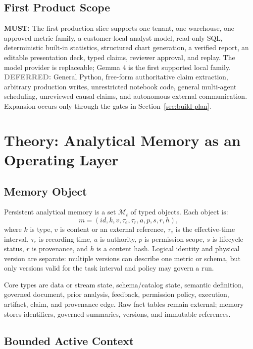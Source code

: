\documentclass[10pt]{article}
\newcommand{\must}{\textbf{\textcolor{amosblue}{MUST:}}\xspace}
\newcommand{\deferred}{\textbf{\textcolor{gray}{DEFERRED:}}\xspace}
\newcommand{\mem}{\mathcal{M}}
\begin{document}
\subsection{First Product Scope}

\must The first production slice supports one tenant, one warehouse, one approved metric family, a customer-local analyst model, read-only SQL, deterministic built-in statistics, structured chart generation, a verified report, an editable presentation deck, typed claims, reviewer approval, and replay. The model provider is replaceable; Gemma 4 is the first supported local family. \deferred General Python, free-form authoritative claim extraction, arbitrary production writes, unrestricted notebook code, general multi-agent scheduling, unreviewed causal claims, and autonomous external communication. Expansion occurs only through the gates in Section~\ref{sec:build-plan}.

\section{Theory: Analytical Memory as an Operating Layer}

\subsection{Memory Object}

Persistent analytical memory is a set $\mem_t$ of typed objects. Each object is:
\begin{equation}
  m = (id, k, v, \tau_e, \tau_r, a, p, s, r, h),
\end{equation}
where $k$ is type, $v$ is content or an external reference, $\tau_e$ is the effective-time interval, $\tau_r$ is recording time, $a$ is authority, $p$ is permission scope, $s$ is lifecycle status, $r$ is provenance, and $h$ is a content hash. Logical identity and physical version are separate: multiple versions can describe one metric or schema, but only versions valid for the task interval and policy may govern a run.

Core types are data or stream state, schema/catalog state, semantic definition, governed document, prior analysis, feedback, permission policy, execution, artifact, claim, and provenance edge. Raw fact tables remain external; memory stores identifiers, governed summaries, versions, and immutable references.

\subsection{Bounded Active Context}
\end{document}
